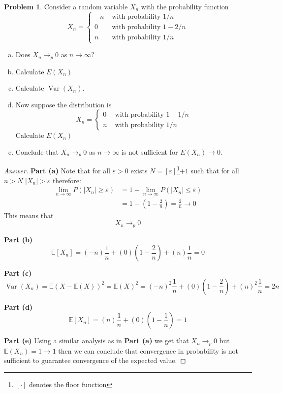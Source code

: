 \documentclass{article}
\theoremstyle{definition}
\newtheorem{problem}{Problem}
\begin{document}
\begin{problem}
Consider a random variable $X_{n}$ with the probability function
$$
X_{n}=\left\{\begin{array}{ll}
-n & \text { with probability } 1 / n \\
0 & \text { with probability } 1-2 / n \\
n & \text { with probability } 1 / n
\end{array}\right.
$$
\begin{enumerate}[(a)]
    \item Does $X_{n} \rightarrow_{p} 0$ as $n \rightarrow \infty ?$
    \item Calculate $E\left(X_{n}\right)$
    \item Calculate $\operatorname{Var}\left(X_{n}\right)$.
    \item Now suppose the distribution is
        $$
        X_{n}=\left\{\begin{array}{ll}
        0 & \text { with probability } 1-1 / n \\
        n & \text { with probability } 1 / n
        \end{array}\right.
        $$
    Calculate $E\left(X_{n}\right)$
    \item Conclude that $X_{n} \rightarrow_{p} 0$ as $n \rightarrow \infty$ is not sufficient for $E\left(X_{n}\right) \rightarrow 0$.
\end{enumerate}
\end{problem}

\begin{proof}[Answer]
\textbf{Part (a)}
Note that for all $\varepsilon>0$ exists $N=[\varepsilon]$\footnote{$[\cdot]$ denotes the floor function}$+1$ such that for all $n>N$ $|X_n|>\varepsilon$ therefore:
\begin{align*}
\lim_{n\to \infty} P(|X_n|\geq \varepsilon) &= 1 - \lim_{n\to \infty} P(|X_n|\leq \varepsilon)   \\
& = 1 - \left(1 - \frac{2}{n}\right) = \frac{2}{n}\to 0 
\end{align*}
This means that 
$$X_n \to_p 0$$

\textbf{Part (b)}
$$\mathbb{E}[X_n] = (-n)\frac{1}{n} + (0)\left(1-\frac{2}{n}\right) + (n)\frac{1}{n} = 0$$

\textbf{Part (c)}
$$\operatorname{Var}(X_n) = \mathbb{E}(X - \mathbb{E}(X))^2 = \mathbb{E}(X)^2 = (-n)^2\frac{1}{n} + (0)\left(1-\frac{2}{n}\right) + (n)^2\frac{1}{n} = 2n$$ 

\textbf{Part (d)}
$$\mathbb{E}[X_n] = (n)\frac{1}{n} + (0)\left(1-\frac{1}{n}\right)= 1$$

\textbf{Part (e)}
Using a similar analysis as in \textbf{Part (a)} we get that $X_n \to_p 0$ but $\mathbb{E}(X_n) = 1 \to 1$ then we can conclude that convergence in probability is not sufficient to guarantee convergence of the expected value. 

\end{proof}
\end{document}
